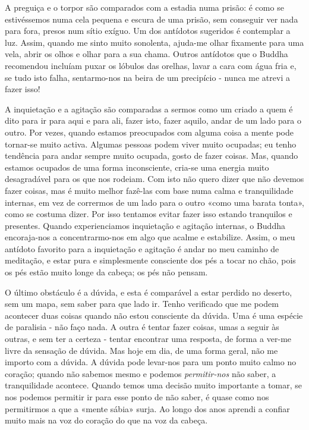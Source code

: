 A preguiça e o torpor são comparados com a estadia numa prisão: é como
se estivéssemos numa cela pequena e escura de uma prisão, sem conseguir
ver nada para fora, presos num sítio exíguo. Um dos antídotos sugeridos
é contemplar a luz. Assim, quando me sinto muito sonolenta, ajuda-me
olhar fixamente para uma vela, abrir os olhos e olhar para a sua chama.
Outros antídotos que o Buddha recomendou incluíam puxar os lóbulos das
orelhas, lavar a cara com água fria e, se tudo isto falha, sentarmo-nos
na beira de um precipício - nunca me atrevi a fazer isso!

A inquietação e a agitação são comparadas a sermos como um criado a quem
é dito para ir para aqui e para ali, fazer isto, fazer aquilo, andar de
um lado para o outro. Por vezes, quando estamos preocupados com alguma
coisa a mente pode tornar-se muito activa. Algumas pessoas podem viver
muito ocupadas; eu tenho tendência para andar sempre muito ocupada,
gosto de fazer coisas. Mas, quando estamos ocupados de uma forma
inconsciente, cria-se uma energia muito desagradável para os que nos
rodeiam. Com isto não quero dizer que não devemos fazer coisas, mas é
muito melhor fazê-las com base numa calma e tranquilidade internas, em
vez de corrermos de um lado para o outro «como uma barata tonta», como
se costuma dizer. Por isso tentamos evitar fazer isso estando tranquilos
e presentes. Quando experienciamos inquietação e agitação internas, o
Buddha \mbox{encoraja-nos} a concentrarmo-nos em algo que acalme e estabilize.
Assim, o meu antídoto favorito para a inquietação e agitação é andar no
meu caminho de meditação, e estar pura e simplesmente consciente dos pés
a tocar no chão, pois os pés estão muito longe da cabeça; os pés não
pensam.

O último obstáculo é a dúvida, e esta é comparável a estar perdido no
deserto, sem um mapa, sem saber para que lado ir. Tenho verificado que
me podem acontecer duas coisas quando não estou consciente da dúvida.
Uma é uma espécie de paralisia - não faço nada. A outra é tentar fazer
coisas, umas a seguir às outras, e sem ter a certeza - tentar encontrar
uma resposta, de forma a \mbox{ver-me} livre da sensação de dúvida. Mas hoje em
dia, de uma forma geral, não me importo com a dúvida. A dúvida pode
levar-nos para um ponto muito calmo no coração; quando não sabemos mesmo
e podemos \emph{permitir-nos} não saber, a tranquilidade acontece.
Quando temos uma decisão muito importante a tomar, se nos podemos
permitir ir para esse ponto de não saber, é quase como nos permitirmos a
que a «mente sábia» surja. Ao longo dos anos aprendi a confiar muito
mais na voz do coração do que na voz da cabeça.

